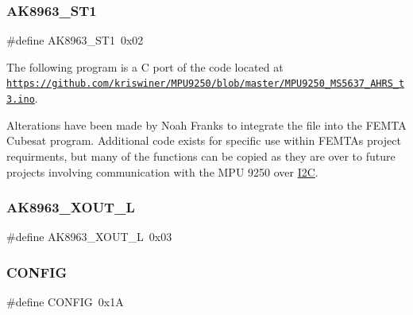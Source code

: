 \subsubsection{\texorpdfstring{A\+K8963\+\_\+\+S\+T1}{AK8963\_ST1}}
{\footnotesize\ttfamily \#define A\+K8963\+\_\+\+S\+T1~0x02}

The following program is a C port of the code located at \href{https://github.com/kriswiner/MPU9250/blob/master/MPU9250_MS5637_AHRS_t3.ino}{\tt https\+://github.\+com/kriswiner/\+M\+P\+U9250/blob/master/\+M\+P\+U9250\+\_\+\+M\+S5637\+\_\+\+A\+H\+R\+S\+\_\+t3.\+ino}.

Alterations have been made by Noah Franks to integrate the file into the F\+E\+M\+TA Cubesat program. Additional code exists for specific use within F\+E\+M\+TA\textquotesingle{}s project requirments, but many of the functions can be copied as they are over to future projects involving communication with the M\+PU 9250 over \hyperlink{structI2C}{I2C}. \mbox{\label{i2c-interface_8c_a35260c212eacc1f2808af33bdc55c8fa}} 
\subsubsection{\texorpdfstring{A\+K8963\+\_\+\+X\+O\+U\+T\+\_\+L}{AK8963\_XOUT\_L}}
{\footnotesize\ttfamily \#define A\+K8963\+\_\+\+X\+O\+U\+T\+\_\+L~0x03}

\mbox{\label{i2c-interface_8c_a76ea3cf49247a07c54b3db005a3c7f57}} 
\subsubsection{\texorpdfstring{C\+O\+N\+F\+IG}{CONFIG}}
{\footnotesize\ttfamily \#define C\+O\+N\+F\+IG~0x1A}

\mbox{\label{i2c-interface_8c_adbbef0e95665e066deb615f04b347491}} 
